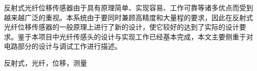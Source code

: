 \begin{ZhAbstract}
    反射式光纤位移传感器由于具有原理简单、实现容易、工作可靠等诸多优点而受到越来越广泛的重视。本系统由于要同时兼顾高精度和大量程的要求，因此在反射式光纤位移传感器的一般原理上进行了新的设计，使它较好的达到了实际的设计要求。鉴于本项目中光纤传感头的设计与实现工作已经基本完成，本文主要侧重于对电路部分的设计与调试工作进行描述。
  
  
    \ChineseKeyWord 反射式，光纤，位移，测量
    
\end{ZhAbstract}